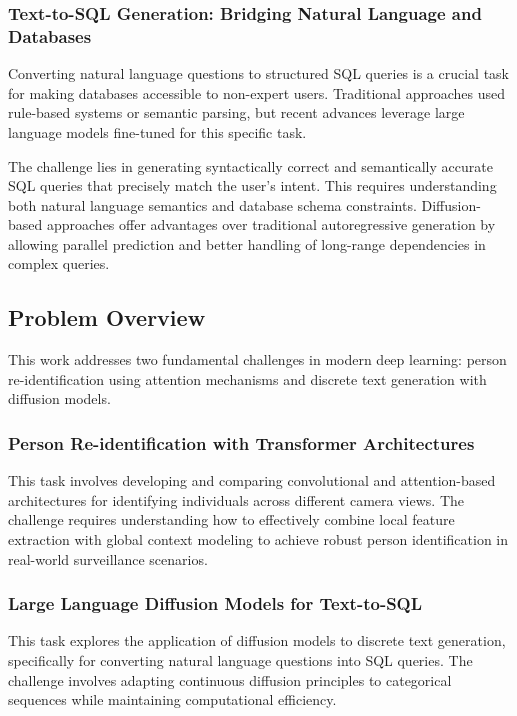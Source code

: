 \documentclass[a4paper,12pt]{article}
\begin{document}
\subsubsection{Text-to-SQL Generation: Bridging Natural Language and Databases}

Converting natural language questions to structured SQL queries is a crucial task for making databases accessible to non-expert users. Traditional approaches used rule-based systems or semantic parsing, but recent advances leverage large language models fine-tuned for this specific task.

The challenge lies in generating syntactically correct and semantically accurate SQL queries that precisely match the user's intent. This requires understanding both natural language semantics and database schema constraints. Diffusion-based approaches offer advantages over traditional autoregressive generation by allowing parallel prediction and better handling of long-range dependencies in complex queries.

\subsection{Problem Overview}

This work addresses two fundamental challenges in modern deep learning: person re-identification using attention mechanisms and discrete text generation with diffusion models.

\subsubsection{Person Re-identification with Transformer Architectures}
This task involves developing and comparing convolutional and attention-based architectures for identifying individuals across different camera views. The challenge requires understanding how to effectively combine local feature extraction with global context modeling to achieve robust person identification in real-world surveillance scenarios.

\subsubsection{Large Language Diffusion Models for Text-to-SQL}
This task explores the application of diffusion models to discrete text generation, specifically for converting natural language questions into SQL queries. The challenge involves adapting continuous diffusion principles to categorical sequences while maintaining computational efficiency.
\end{document}
